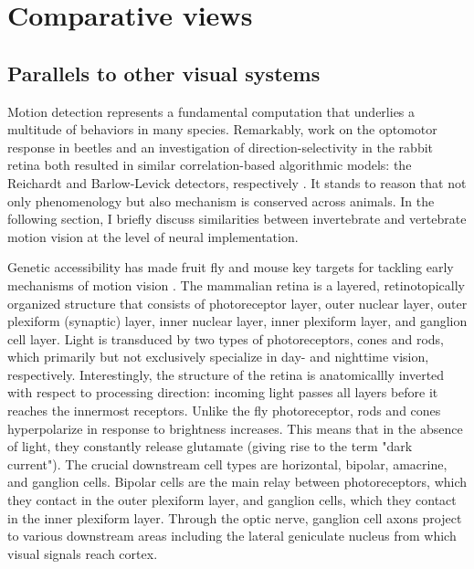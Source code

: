 \section{Comparative views}
\subsection{Parallels to other visual systems}
Motion detection represents a fundamental computation that underlies a multitude of behaviors in many species. Remarkably, work on the optomotor response in beetles and an investigation of direction-selectivity in the rabbit retina both resulted in similar correlation-based algorithmic models: the Reichardt and Barlow-Levick detectors, respectively \citep{Hassenstein:1956fa,Barlow:1965aa}. It stands to reason that not only phenomenology but also mechanism is conserved across animals. In the following section, I briefly discuss similarities between invertebrate and vertebrate motion vision at the level of neural implementation.

Genetic accessibility has made fruit fly and mouse key targets for tackling early mechanisms of motion vision \citep[for thorough reviews, see][]{Borst:2015ko,Euler:2014aa}. The mammalian retina is a layered, retinotopically organized structure that consists of photoreceptor layer, outer nuclear layer, outer plexiform (synaptic) layer, inner nuclear layer, inner plexiform layer, and ganglion cell layer. Light is transduced by two types of photoreceptors, cones and rods, which primarily but not exclusively specialize in day- and nighttime vision, respectively. Interestingly, the structure of the retina is anatomicallly inverted with respect to processing direction: incoming light passes all layers before it reaches the innermost receptors. Unlike the fly photoreceptor, rods and cones hyperpolarize in response to brightness increases. This means that in the absence of light, they constantly release glutamate (giving rise to the term "dark current"). The crucial downstream cell types are horizontal, bipolar, amacrine, and ganglion cells. Bipolar cells are the main relay between photoreceptors, which they contact in the outer plexiform layer, and ganglion cells, which they contact in the inner plexiform layer. Through the optic nerve, ganglion cell axons project to various downstream areas including the lateral geniculate nucleus from which visual signals reach cortex.

